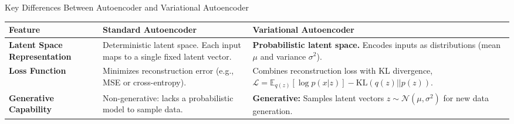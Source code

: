 \documentclass{beamer}
\begin{document}
\begin{frame}{Key Differences Between Autoencoder and Variational Autoencoder}

\begin{table}[ht]
\centering
\scriptsize %
\renewcommand{\arraystretch}{1.5} %
\begin{tabular}{|p{}|p{}|p{}|}
\hline
\rowcolor{blue!20} \textbf{Feature} & \textbf{Standard Autoencoder} & \textbf{Variational Autoencoder} \\ \hline

\textbf{Latent Space Representation} & Deterministic latent space. Each input maps to a single fixed latent vector. & \textbf{Probabilistic latent space.} Encodes inputs as distributions (mean \( \mu \) and variance \( \sigma^2 \)).\\ \hline 

\rowcolor{blue!10}\textbf{Loss Function} & Minimizes reconstruction error (e.g., MSE or cross-entropy). & Combines reconstruction loss with KL divergence,\(\mathcal{L} = \mathbb{E}_{q(z)}[\log p(x|z)] - \text{KL}(q(z) || p(z))\). \\ \hline 

\textbf{Generative Capability} & Non-generative: lacks a probabilistic model to sample data. & \textbf{Generative:} Samples latent vectors \( z \sim \mathcal{N}(\mu, \sigma^2) \) for new data generation. \\ \hline

\end{tabular}
\end{table}

\end{frame}
\end{document}
